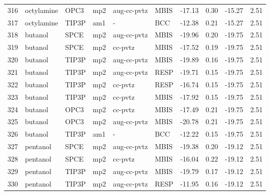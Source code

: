 \begin{tabular}{llllllrrrr}
316 &                     octylamine &       OPC3 &      mp2 &  aug-cc-pvtz &         MBIS & -17.13 &      0.30 &      -15.27 &     2.51 \\
317 &                     octylamine &      TIP3P &      am1 &            - &          BCC & -12.38 &      0.21 &      -15.27 &     2.51 \\
318 &                        butanol &       SPCE &      mp2 &  aug-cc-pvtz &         MBIS & -19.96 &      0.20 &      -19.75 &     2.51 \\
319 &                        butanol &       SPCE &      mp2 &      cc-pvtz &         MBIS & -17.52 &      0.19 &      -19.75 &     2.51 \\
320 &                        butanol &      TIP3P &      mp2 &  aug-cc-pvtz &         MBIS & -19.89 &      0.16 &      -19.75 &     2.51 \\
321 &                        butanol &      TIP3P &      mp2 &  aug-cc-pvtz &         RESP & -19.71 &      0.15 &      -19.75 &     2.51 \\
322 &                        butanol &      TIP3P &      mp2 &      cc-pvtz &         RESP & -16.74 &      0.15 &      -19.75 &     2.51 \\
323 &                        butanol &      TIP3P &      mp2 &      cc-pvtz &         MBIS & -17.92 &      0.15 &      -19.75 &     2.51 \\
324 &                        butanol &       OPC3 &      mp2 &      cc-pvtz &         MBIS & -17.49 &      0.21 &      -19.75 &     2.51 \\
325 &                        butanol &       OPC3 &      mp2 &  aug-cc-pvtz &         MBIS & -20.78 &      0.21 &      -19.75 &     2.51 \\
326 &                        butanol &      TIP3P &      am1 &            - &          BCC & -12.22 &      0.15 &      -19.75 &     2.51 \\
327 &                       pentanol &       SPCE &      mp2 &  aug-cc-pvtz &         MBIS & -19.38 &      0.20 &      -19.12 &     2.51 \\
328 &                       pentanol &       SPCE &      mp2 &      cc-pvtz &         MBIS & -16.04 &      0.22 &      -19.12 &     2.51 \\
329 &                       pentanol &      TIP3P &      mp2 &  aug-cc-pvtz &         MBIS & -19.79 &      0.17 &      -19.12 &     2.51 \\
330 &                       pentanol &      TIP3P &      mp2 &  aug-cc-pvtz &         RESP & -11.95 &      0.16 &      -19.12 &     2.51 \\

\end{tabular}
